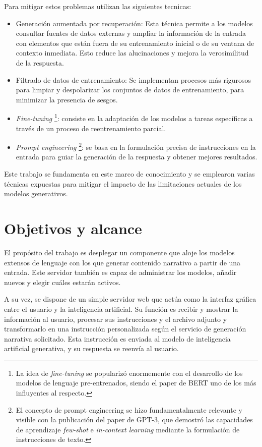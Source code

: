 Para mitigar estos problemas utilizan las siguientes tecnicas:
\begin{itemize}
\item Generación aumentada por recuperación:
Esta técnica permite a los modelos consultar fuentes de datos externas 
y ampliar la información de la entrada con elementos que están fuera de su entrenamiento inicial
o de su ventana de contexto inmediata.
Esto reduce las alucinaciones y mejora la verosimilitud de la respuesta.
\item Filtrado de datos de entrenamiento: 
Se implementan procesos más rigurosos para limpiar y despolarizar los conjuntos de datos de entrenamiento,
para minimizar la presencia de sesgos.
\item \textit{Fine-tuning}
\footnote{La idea de \textit{fine-tuning} se popularizó enormemente con el desarrollo de los modelos de lenguaje pre-entrenados,
siendo el paper de BERT\cite{Devlin2019BERT} uno de los más influyentes al respecto.}: 
consiste en la adaptación de los modelos a tareas específicas a través de un proceso de reentrenamiento parcial.
\item \textit{Prompt engineering}
\footnote{El concepto de prompt engineering se hizo fundamentalmente relevante y visible con la publicación del paper de GPT-3\cite{Brown2020GPT3},
que demostró las capacidades de aprendizaje \textit{few-shot} e \textit{in-context learning} mediante la formulación de instrucciones de texto.}:
se basa en la formulación precisa de instrucciones en la entrada para guiar la generación de la respuesta 
y obtener mejores resultados.
\end{itemize}

Este trabajo se fundamenta en este marco de conocimiento
y se emplearon varias técnicas expuestas para mitigar el impacto de las
limitaciones actuales de los modelos generativos.


\section{Objetivos y alcance}
El propósito del trabajo es desplegar un componente que aloje los modelos extensos de lenguaje
con los que generar contenido narrativo a partir de una entrada.
Este servidor también es capaz de administrar los modelos, añadir nuevos y elegir cuáles estarán activos.

A su vez, se dispone de un simple servidor web que actúa como la interfaz gráfica entre el usuario y
la inteligencia artificial. Su función es recibir y mostrar la información al usuario,
procesar sus instrucciones y el archivo adjunto
y transformarlo en una instrucción personalizada según el servicio de generación narrativa solicitado.
Esta instrucción es enviada al modelo de inteligencia artificial generativa, y su respuesta se reenvía al usuario.

